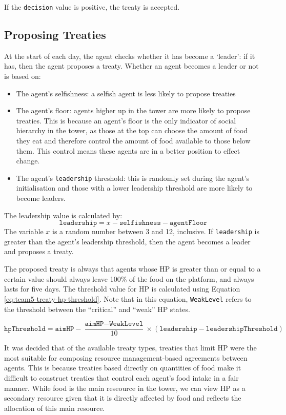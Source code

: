 If the \texttt{decision} value is positive, the treaty is accepted.

\subsection*{Proposing Treaties}\label{sec:team5-treaties-proposal}
At the start of each day, the agent checks whether it has become a `leader': if it has, then the agent proposes a treaty. Whether an agent becomes a leader or not is based on:
\begin{itemize}
    \item The agent's selfishness: a selfish agent is less likely to propose treaties
    \item The agent's floor: agents higher up in the tower are more likely to propose treaties. This is because an agent's floor is the only indicator of social hierarchy in the tower, as those at the top can choose the amount of food they eat and therefore control the amount of food available to those below them. This control means these agents are in a better position to effect change.
    \item The agent's \texttt{leadership} threshold: this is randomly set during the agent's initialisation and those with a lower leadership threshold are more likely to become leaders.
\end{itemize}
The leadership value is calculated by:
\[ \texttt{leadership} = x - \texttt{selfishness} - \texttt{agentFloor}\]
The variable $x$ is a random number between 3 and 12, inclusive. If \texttt{leadership} is greater than the agent's leadership threshold, then the agent becomes a leader and proposes a treaty.

The proposed treaty is always that agents whose HP is greater than or equal to a certain value should always leave 100\% of the food on the platform, and always lasts for five days. The threshold value for HP is calculated using Equation \ref{eq:team5-treaty-hp-threshold}. Note that in this equation, \texttt{WeakLevel} refers to the threshold between the ``critical'' and ``weak'' HP states.

\begin{equation}\label{eq:team5-treaty-hp-threshold}
    \texttt{hpThreshold} = \texttt{aimHP} - \frac{\texttt{aimHP} - \texttt{WeakLevel}}{10}\times\left(\texttt{leadership} - \texttt{leadershipThreshold}\right)
\end{equation}

It was decided that of the available treaty types, treaties that limit HP were the most suitable for composing resource management-based agreements between agents. This is because treaties based directly on quantities of food make it difficult to construct treaties that control each agent's food intake in a fair manner. While food is the main reseource in the tower, we can view HP as a secondary resource given that it is directly affected by food and reflects the allocation of this main resource.

